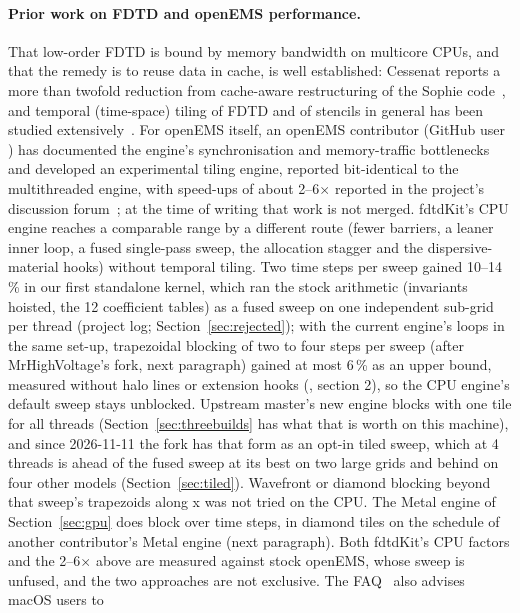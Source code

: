 \paragraph{Prior work on FDTD and openEMS performance.} That low-order FDTD is bound by memory bandwidth on
multicore CPUs, and that the remedy is to reuse data in cache, is well established: Cessenat reports a more than
twofold reduction from cache-aware restructuring of the Sophie code~\cite{sophie}, and temporal (time-space) tiling
of FDTD and of stencils in general has been studied extensively~\cite{fukaya2018,malas2015}. For openEMS itself, an
openEMS contributor (GitHub user ) has documented the engine's synchronisation and memory-traffic
bottlenecks and developed an experimental tiling engine, reported bit-identical to the multithreaded engine, with
speed-ups of about 2--6$\times$ reported in the project's discussion forum~\cite{biergaizi154,biergaizi29}; at the
time of writing that work is not merged. fdtdKit's CPU engine reaches a comparable range by a different route (fewer
barriers, a leaner inner loop, a fused single-pass sweep, the allocation stagger and the dispersive-material hooks)
without temporal tiling. Two time steps per sweep gained 10--14\,\% in our first standalone kernel, which ran the stock
arithmetic (invariants hoisted, the 12 coefficient tables) as a fused sweep on one independent sub-grid per thread
(project log; Section~\ref{sec:rejected}); with the current engine's loops in the same set-up, trapezoidal blocking of
two to four steps per sweep (after MrHighVoltage's fork, next paragraph) gained at most 6\,\% as an upper bound, measured
without halo lines or extension hooks (, section 2), so the CPU engine's
default sweep stays unblocked. Upstream master's new  engine
blocks with one tile for all threads (Section~\ref{sec:threebuilds} has what that is worth on this machine), and
since 2026-11-11 the fork has that form as an opt-in tiled sweep, which at 4 threads is ahead of the fused sweep at
its best on two large grids and behind on four other models (Section~\ref{sec:tiled}). Wavefront or diamond blocking
beyond that sweep's
trapezoids along x was not tried on the CPU.
The Metal engine of
Section~\ref{sec:gpu} does block over time steps, in diamond tiles on the schedule of another contributor's Metal
engine (next paragraph). Both fdtdKit's CPU factors and the 2--6$\times$ above are measured against stock openEMS, whose
sweep is unfused, and the two approaches are not exclusive. The FAQ~\cite{biergaizi29} also advises macOS users to
